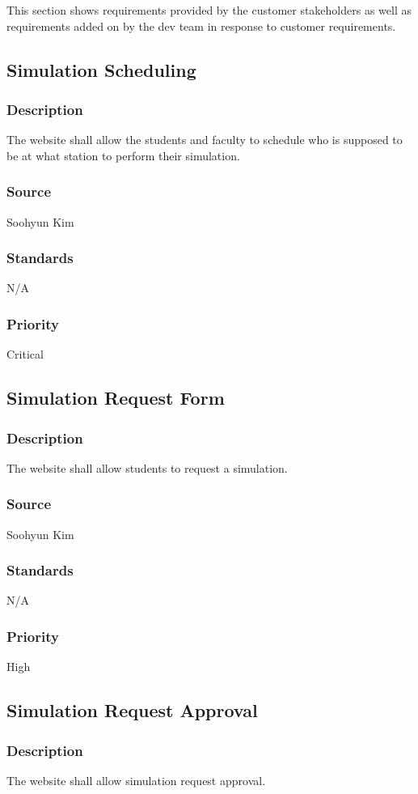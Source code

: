 This section shows requirements provided by the customer stakeholders as well as requirements added on by the dev team in response to customer requirements.

\subsection{Simulation Scheduling}
\subsubsection{Description}
The website shall allow the students and faculty to schedule who is supposed to be at what station to perform their simulation.
\subsubsection{Source}
Soohyun Kim
\subsubsection{Standards}
N/A
\subsubsection{Priority}
Critical

\subsection{Simulation Request Form}
\subsubsection{Description}
The website shall allow students to request a simulation.
\subsubsection{Source}
Soohyun Kim
\subsubsection{Standards}
N/A
\subsubsection{Priority}
High

\subsection{Simulation Request Approval}
\subsubsection{Description}
The website shall allow simulation request approval.
